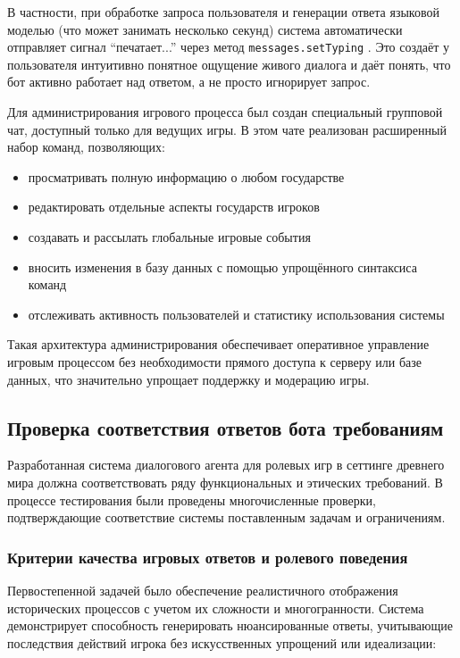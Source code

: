 В частности, при обработке запроса пользователя и генерации ответа языковой моделью (что может занимать несколько секунд) система автоматически отправляет сигнал ``печатает...'' через метод \texttt{messages.setTyping} \cite{telegram_typing}. Это создаёт у пользователя интуитивно понятное ощущение живого диалога и даёт понять, что бот активно работает над ответом, а не просто игнорирует запрос.

Для администрирования игрового процесса был создан специальный групповой чат, доступный только для ведущих игры. В этом чате реализован расширенный набор команд, позволяющих:
\begin{itemize}
\item просматривать полную информацию о любом государстве
\item редактировать отдельные аспекты государств игроков
\item создавать и рассылать глобальные игровые события
\item вносить изменения в базу данных с помощью упрощённого синтаксиса команд
\item отслеживать активность пользователей и статистику использования системы
\end{itemize}

Такая архитектура администрирования обеспечивает оперативное управление игровым процессом без необходимости прямого доступа к серверу или базе данных, что значительно упрощает поддержку и модерацию игры.

\subsection{Проверка соответствия ответов бота требованиям}

Разработанная система диалогового агента для ролевых игр в сеттинге древнего мира должна соответствовать ряду функциональных и этических требований. В процессе тестирования были проведены многочисленные проверки, подтверждающие соответствие системы поставленным задачам и ограничениям.

\subsubsection{Критерии качества игровых ответов и ролевого поведения}

Первостепенной задачей было обеспечение реалистичного отображения исторических процессов с учетом их сложности и многогранности. Система демонстрирует способность генерировать нюансированные ответы, учитывающие последствия действий игрока без искусственных упрощений или идеализации:

